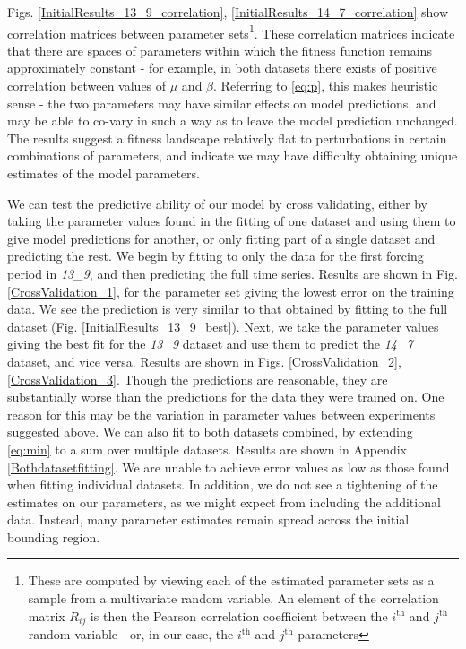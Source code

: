 \documentclass[10pt,journal]{./IEEE_latex_class/IEEEtran}
\begin{document}
Figs. \ref{InitialResults_13_9_correlation}, \ref{InitialResults_14_7_correlation} show correlation matrices between parameter sets\footnote{These are computed by viewing each of the estimated parameter sets as a sample from a multivariate random variable. An element of the correlation matrix $R_{ij}$ is then the Pearson correlation coefficient between the $i^\mathrm{th}$ and $j^\mathrm{th}$ random variable - or, in our case, the $i^\mathrm{th}$ and $j^\mathrm{th}$ parameters}. These correlation matrices indicate that there are spaces of parameters within which the fitness function remains approximately constant - for example, in both datasets there exists of positive correlation between values of $\mu$ and $\beta$. Referring to \eqref{eq:p}, this makes heuristic sense - the two parameters may have similar effects on model predictions, and may be able to co-vary in such a way as to leave the model prediction unchanged.
The results suggest a fitness landscape relatively flat to perturbations in certain combinations of parameters, and indicate we may have difficulty obtaining unique estimates of the model parameters.
 
 We can test the predictive ability of our model by cross validating, either by taking the parameter values found in the fitting of one dataset and using them to give model predictions for another, or only fitting part of a single dataset and predicting the rest.  We begin by fitting to only the data for the first forcing period in \textit{13\_9}, and then predicting the full time series. Results are shown in Fig. \ref{CrossValidation_1}, for the parameter set giving the lowest error on the training data. We see the prediction is very similar to that obtained by fitting to the full dataset (Fig. \ref{InitialResults_13_9_best}). Next, we take the parameter values giving the best fit for the  \textit{13\_9} dataset and use them to predict the \textit{14\_7} dataset, and vice versa. Results are shown in Figs. \ref{CrossValidation_2}, \ref{CrossValidation_3}.
Though the predictions are reasonable, they are substantially worse than the predictions for the data they were trained on. One reason for this may be the variation in parameter values between experiments suggested above. We can also fit to both datasets combined, by extending \eqref{eq:min} to a sum over multiple datasets. Results are shown in Appendix \ref{Bothdatasetfitting}. We are unable to achieve error values as low as those found when fitting individual datasets. In addition, we do not see a tightening of the estimates on our parameters, as we might expect from including the additional data. Instead, many parameter estimates remain spread across the initial bounding region. 
\end{document}
